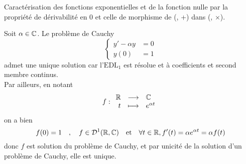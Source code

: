 \documentclass{article}
\begin{document}
\begin{question_kholle}[{
        \begin{propositions}
          \item \textit{Comme solution d’un problème de Cauchy.} Soit $\alpha\in\C$.
          \[
            \applic{\R}{\C}{t}{e^{\alpha t}} \text{ est l’unique solution de } \begin{cases}
              y'-\alpha y & =0 \\
              y(0)        & =1
            \end{cases}
          \]
          \item \textit{Par la propriété de morphisme et de non-annulation.}
          \begin{multline}
            \left\{f:\R\longrightarrow\C \middle| f \text{ dérivable en 0 et } \forall (s,u)\in\R^{2}, f(s+u)=f(s)f(u)\right\} \\=\{\widetilde{0}\}\cup \left\{\applic{\R}{\C}{t}{e^{\alpha t}}\middle| \alpha\in\C\right\}
          \end{multline}
        \end{propositions}
      }]{Caractérisation des fonctions exponentielles et de la fonction nulle par la propriété de dérivabilité en 0 et celle de morphisme de (\R, +) dans (\C, $\times$).}
  \begin{propositions}
    \item Soit $\alpha\in\C$. Le problème de Cauchy
    \[
      \begin{cases}
        y'-\alpha y & =0 \\
        y(0)        & =1
      \end{cases}
    \]
    admet une unique solution car l’$\mathrm{EDL_{1}}$ est résolue et à coefficients et second membre continus.\\
    Par ailleurs, en notant
    \[
      f:\begin{array}{rcl} \mathbb R & \longrightarrow & \mathbb C \\ t & \longmapsto & e^{\alpha t} \end{array}
    \]
    on a bien
    \[
      f(0)=1 \quad , \quad f\in\mathcal{D}^{1}(\mathbb R,\mathbb C) \quad\text{et}\quad \forall t\in\mathbb R, f'(t)=\alpha e^{\alpha t}=\alpha f(t)
    \]
    donc $f$ est solution du problème de Cauchy, et par unicité de la solution d’un problème de Cauchy, elle est unique.


\end{propositions}
\end{question_kholle}
\end{document}
